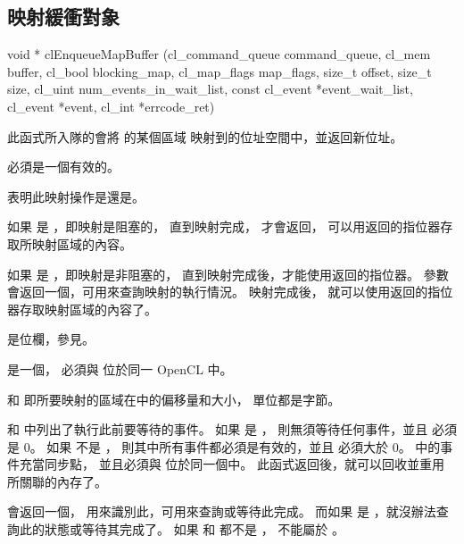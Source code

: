 \subsection{映射緩衝對象}


\startCLFUNC
void * clEnqueueMapBuffer (cl_command_queue command_queue,
			cl_mem buffer,
			cl_bool blocking_map,
			cl_map_flags map_flags,
			size_t offset,
			size_t size,
			cl_uint num_events_in_wait_list,
			const cl_event *event_wait_list,
			cl_event *event,
			cl_int *errcode_ret)
\stopCLFUNC

此函式所入隊的會將  的某個區域
映射到的位址空間中，並返回新位址。

 必須是一個有效的。

 表明此映射操作是{}還是{}。

如果  是 ，即映射是阻塞的，
直到映射完成，  才會返回，
可以用返回的指位器存取所映射區域的內容。

如果  是 ，即映射是非阻塞的，
直到映射完成後，才能使用返回的指位器。
參數  會返回一個，可用來查詢映射的執行情況。
映射完成後，
就可以使用返回的指位器存取映射區域的內容了。

 是位欄，參見。

 是一個，
必須與  位於同一 OpenCL 中。

 和  即所要映射的區域在中的偏移量和大小，
單位都是字節。

 和 
中列出了執行此前要等待的事件。
如果  是 ，
則無須等待任何事件，並且  必須是 0。
如果  不是 ，
則其中所有事件都必須是有效的，並且  必須大於 0。
 中的事件充當同步點，
並且必須與  位於同一個中。
此函式返回後，就可以回收並重用  所關聯的內存了。

 會返回一個，
用來識別此，可用來查詢或等待此完成。
而如果  是 ，就沒辦法查詢此的狀態或等待其完成了。
如果  和  都不是 ，
 不能屬於 。

